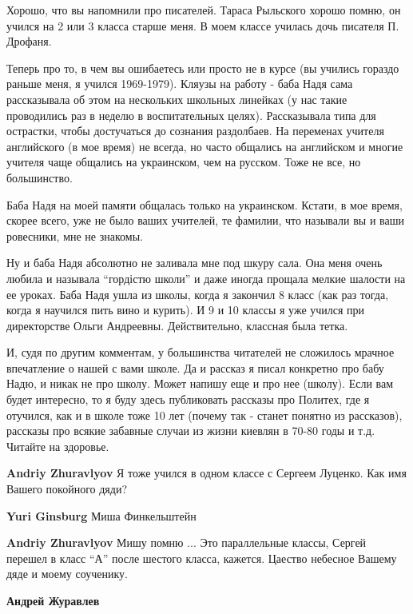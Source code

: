 \begin{itemize}
\begin{itemize}
Хорошо, что вы напомнили про писателей.  Тараса Рыльского хорошо помню, он
учился на 2 или 3 класса старше меня. В моем классе училась дочь писателя П.
Дрофаня. 

Теперь про то, в чем вы ошибаетесь или просто не в курсе (вы учились гораздо
раньше меня, я учился 1969-1979). Кляузы на работу - баба Надя сама
рассказывала об этом на нескольких школьных линейках (у нас такие проводились
раз в неделю в воспитательных целях). Рассказывала типа для острастки, чтобы
достучаться до сознания раздолбаев. На переменах учителя английского (в мое
время) не всегда, но часто общались на английском и многие учителя чаще
общались на украинском, чем на русском. Тоже не все, но большинство. 

Баба Надя на моей памяти общалась только на украинском. Кстати, в мое время,
скорее всего, уже не было ваших учителей, те фамилии, что называли вы и ваши
ровесники, мне не знакомы. 

Ну и баба Надя абсолютно не заливала мне под шкуру сала. Она меня очень любила
и называла \enquote{гордістю школи} и даже иногда прощала мелкие шалости на ее
уроках. Баба Надя ушла из школы, когда я закончил 8 класс (как раз тогда, когда
я научился пить вино и курить). И 9 и 10 классы я уже учился при директорстве
Ольги Андреевны. Действительно, классная была тетка.

И, судя по другим комментам, у большинства читателей не сложилось мрачное
впечатление о нашей с вами школе. Да и рассказ я писал конкретно про бабу Надю,
и никак не про школу. Может напишу еще и про нее (школу). Если вам будет
интересно, то я буду здесь публиковать рассказы про Политех, где я отучился,
как и в школе тоже 10 лет (почему так - станет понятно из рассказов), рассказы
про всякие забавные случаи из жизни киевлян в 70-80 годы и т.д. Читайте на
здоровье.

\begin{itemize} %
\textbf{Andriy Zhuravlyov} Я тоже учился в одном классе с Сергеем Луценко. Как имя Вашего покойного дяди?

\textbf{Yuri Ginsburg} Миша Финкельштейн

\textbf{Andriy Zhuravlyov} Мишу помню ... Это параллельные классы, Сергей перешел в класс \enquote{А} после шестого класса, кажется.
Цаество небесное Вашему дяде и моему соученику.

\textbf{Андрей Журавлев} 


\end{itemize}
\end{itemize}
\end{itemize}
